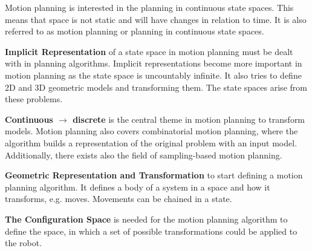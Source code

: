 Motion planning is interested in the planning in continuous state spaces. This means that space is not static and will have changes in relation to time. It is also referred to as motion planning or planning in continuous state spaces. \cite{planning_algorithms_steven_m_lavalle}

\textbf{Implicit Representation} of a state space in motion planning must be dealt with in planning algorithms. Implicit representations become more important in motion planning as the state space is uncountably infinite. It also tries to define 2D and 3D geometric models and transforming them. The state spaces arise from these problems. \cite{planning_algorithms_steven_m_lavalle}

\textbf{Continuous $\rightarrow$ discrete} is the central theme in motion planning to transform models. Motion planning also covers combinatorial motion planning, where the algorithm builds a representation of the original problem with an input model. Additionally, there exists also the field of sampling-based motion planning. \cite{planning_algorithms_steven_m_lavalle}

\textbf{Geometric Representation and Transformation} to start defining a motion planning algorithm. It defines a body of a system in a space and how it transforms, e.g. moves. Movements can be chained in a state. \cite{planning_algorithms_steven_m_lavalle}

\textbf{The Configuration Space} is needed for the motion planning algorithm to define the space, in which a set of possible transformations could be applied to the robot. \cite{planning_algorithms_steven_m_lavalle}

